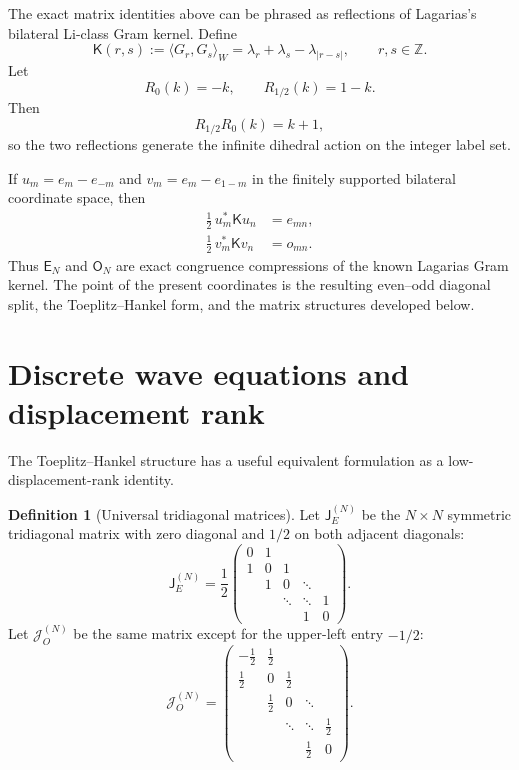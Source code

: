 \documentclass[11pt]{amsart}
\numberwithin{equation}{section}
\theoremstyle{plain}
\theoremstyle{definition}
\newtheorem{definition}[theorem]{Definition}
\theoremstyle{remark}
\newcommand{\E}{\mathsf E}
\newcommand{\Omat}{\mathsf O}
\newcommand{\Kmat}{\mathsf K}
\newcommand{\J}{\mathsf J}
\begin{document}
The exact matrix identities above can be phrased as reflections of Lagarias's bilateral Li-class Gram kernel. Define
\begin{equation}
\Kmat(r,s):=\langle G_r,G_s\rangle_W
=\lambda_r+\lambda_s-\lambda_{|r-s|},
\qquad r,s\in\mathbb Z.
\label{eq:bilateral_kernel}
\end{equation}
Let
\begin{equation}
R_0(k)=-k,
\qquad
R_{1/2}(k)=1-k.
\label{eq:two_reflections}
\end{equation}
Then
\begin{equation}
R_{1/2}R_0(k)=k+1,
\label{eq:reflection_translation}
\end{equation}
so the two reflections generate the infinite dihedral action on the integer label set.

If $u_m=e_m-e_{-m}$ and $v_m=e_m-e_{1-m}$ in the finitely supported bilateral coordinate space, then
\begin{align}
\frac12\,u_m^*\Kmat u_n
&=e_{mn},
\label{eq:E_reflection_compression}\\
\frac12\,v_m^*\Kmat v_n
&=o_{mn}.
\label{eq:O_reflection_compression}
\end{align}
Thus $\E_N$ and $\Omat_N$ are exact congruence compressions of the known Lagarias Gram kernel. The point of the present coordinates is the resulting even--odd diagonal split, the Toeplitz--Hankel form, and the matrix structures developed below.

\section{Discrete wave equations and displacement rank}
\label{sec:displacement}

The Toeplitz--Hankel structure has a useful equivalent formulation as a low-displacement-rank identity.

\begin{definition}[Universal tridiagonal matrices]
\label{def:universal_tridiagonal}
Let $\J_E^{(N)}$ be the $N\times N$ symmetric tridiagonal matrix with zero diagonal and $1/2$ on both adjacent diagonals:
\begin{equation}
\J_E^{(N)}=
\frac12
\begin{pmatrix}
0&1&&&\\
1&0&1&&\\
&1&0&\ddots&\\
&&\ddots&\ddots&1\\
&&&1&0
\end{pmatrix}.
\label{eq:J_E_definition}
\end{equation}
Let $\mathcal J_O^{(N)}$ be the same matrix except for the upper-left entry $-1/2$:
\begin{equation}
\mathcal J_O^{(N)}=
\begin{pmatrix}
-\tfrac12&\tfrac12&&&\\
\tfrac12&0&\tfrac12&&\\
&\tfrac12&0&\ddots&\\
&&\ddots&\ddots&\tfrac12\\
&&&\tfrac12&0
\end{pmatrix}.
\label{eq:J_O_definition}
\end{equation}
\end{definition}
\end{document}
